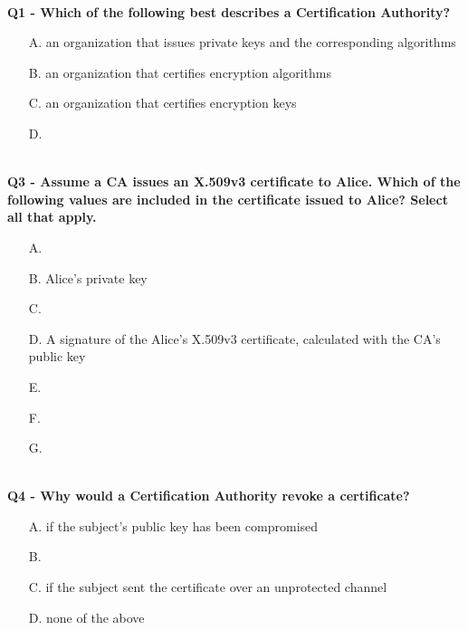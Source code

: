 \textbf{\\Q1 - Which of the following best describes a Certification Authority?}
\begin{enumerate}
    \item[A.] an organization that issues private keys and the corresponding algorithms
    \item[B.] an organization that certifies encryption algorithms
    \item[C.] an organization that certifies encryption keys
    \item[D.] 
\end{enumerate}

\textbf{\\Q3 - Assume a CA issues an X.509v3 certificate to Alice. Which of the following values are included in the certificate issued to Alice? Select all that apply.}
\begin{itemize}
    \item[A.] 
    \item[B.] Alice’s private key
    \item[C.] 
    \item[D.] A signature of the Alice’s X.509v3 certificate, calculated with the CA’s public key
    \item[E.] 
    \item[F.] 
    \item[G.] 
\end{itemize}

\textbf{\\Q4 - Why would a Certification Authority revoke a certificate?}
\begin{enumerate}
    \item[A.] if the subject’s public key has been compromised
    \item[B.] 
    \item[C.] if the subject sent the certificate over an unprotected channel
    \item[D.] none of the above
\end{enumerate}

